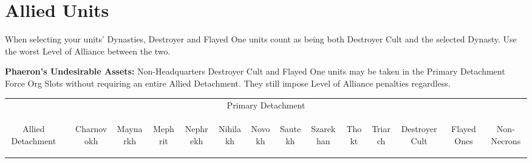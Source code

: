 \section{Allied Units}

When selecting your units' Dynasties, Destroyer and Flayed One units count as being both Destroyer Cult and the selected Dynasty. Use the worst Level of Alliance between the two.

\textbf{Phaeron's Undesirable Assets:} Non-Headquarters Destroyer Cult and Flayed One units may be taken in the Primary Detachment Force Org Slots without requiring an entire Allied Detachment. They still impose Level of Alliance penalties regardless.

\begin{tabular}{||c c c c c c c c c c c c c c c||}
	\hline
	\multicolumn{15}{||c||}{Primary Detachment} \\
	\multirow{14}{*}{\begin{sideways}Allied Detachment\end{sideways}} & & \begin{sideways}Charnovokh \end{sideways} & \begin{sideways}Maynarkh \end{sideways} & \begin{sideways}Mephrit \end{sideways} & \begin{sideways}Nephrekh \end{sideways} & \begin{sideways}Nihilakh \end{sideways} & \begin{sideways}Novokh \end{sideways} & \begin{sideways}Sautekh \end{sideways} & \begin{sideways}Szarekhan \end{sideways} & \begin{sideways}Thokt \end{sideways} & \begin{sideways}Triarch \end{sideways} & \begin{sideways}Destroyer Cult \end{sideways} & \begin{sideways}Flayed Ones \end{sideways} & \begin{sideways}Non-Necrons \end{sideways}\\

\end{tabular}
